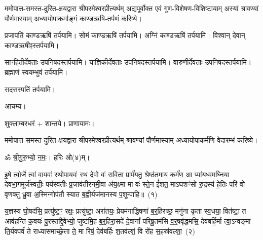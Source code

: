 ममोपात्त-समस्त-दुरित-क्षयद्वारा श्रीपरमेश्वरप्रीत्यर्थम्
अद्य\-पूर्वोक्त एवं गुण-विशेषण-विशिष्टायाम्
अस्यां श्रावण्यां पौर्णमास्याम् अध्यायोपाकर्माङ्गं काण्डऋषि-तर्पणं करिष्ये।


प्रजापतिं काण्डऋषिं तर्पयामि।
सोमं काण्डऋषिं तर्पयामि।
अग्निं काण्डऋषिं तर्पयामि।
विश्वान् देवान् काण्डऋषीꣴ\-स्तर्पयामि।

साꣳहितीर्देवताः उपनिषद\-स्तर्पयामि।
याज्ञिकीर्देवताः उपनिषद\-स्तर्पयामि।
वारुणीर्देवताः उपनिषद\-स्तर्पयामि।
ब्रह्माणं स्वयम्भुवं तर्पयामि। %

सदसस्पतिं तर्पयामि।

आचम्य।





शुक्लाम्बरधरं + शान्तये। प्राणायामः।

ममोपात्त-समस्त-दुरित-क्षयद्वारा श्रीपरमेश्वरप्रीत्यर्थम्
श्रावण्यां पौर्णमास्याम् अध्यायोपाकर्मणि वेदारम्भं करिष्ये।


ॐ श्री॒गु॒रु॒भ्यो॒ न॒मः॒। हरिः ओ(४)म्।

इ॒षे त्वो॒र्जे त्वा॑ वा॒यवः॑ स्थोपा॒यवः॑ स्थ दे॒वो वः॑ सवि॒ता प्रार्प॑यतु॒ श्रेष्ठ॑तमाय॒ कर्म॑ण॒ आ प्या॑यध्वमघ्निया देवभा॒गमूर्ज॑स्वतीः॒ पय॑स्वतीः प्र॒जाव॑तीरनमी॒वा अ॑य॒क्ष्मा मा वः॑ स्ते॒न ई॑शत॒ मा\-ऽघशꣳ॑सो रु॒द्रस्य॑ हे॒तिः परि॑ वो वृणक्तु ध्रु॒वा अ॒स्मिन्गोप॑तौ स्यात ब॒ह्वीर्यज॑मानस्य प॒शून्पा॑हि॥~(१)

य॒ज्ञस्य॑ घो॒षद॑सि॒ प्रत्यु॑ष्ट॒ꣳ॒ रक्षः॒ प्रत्यु॑ष्टा॒ अरा॑तयः॒ प्रेयम॑गाद्धि॒षणा॑ ब॒र्॒हिरच्छ॒ मनु॑ना कृ॒ता स्व॒धया॒ वित॑ष्टा॒ त आव॑हन्ति क॒वयः॑ पु॒रस्ता᳚द्दे॒वेभ्यो॒ जुष्ट॑मि॒ह ब॒र्॒हिरा॒सदे॑ दे॒वानां᳚ परिषू॒तम॑सि व॒र्॒षवृ॑द्धमसि॒ देव॑बर्\mbox{}हि॒र्मा त्वा॒\-ऽन्वङ्मा ति॒र्यक्पर्व॑ ते राध्यासमाच्छे॒त्ता ते॒ मा रि॑षं॒ देव॑बर्\mbox{}हिः श॒तव॑ल्\mbox{}शं॒ वि रो॑ह स॒हस्र॑वल्\mbox{}शा॒~(२)

